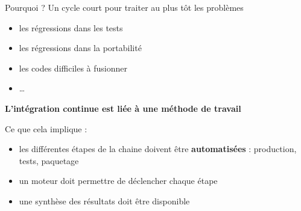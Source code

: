 \documentclass[9pt]{beamer}
\begin{document}
\begin{frame}{}

  \begin{block}{Pourquoi ?}
    Un cycle court pour traiter au plus tôt les problèmes
    \begin{itemize}
    \item les régressions dans les tests
    \item les régressions dans la portabilité
    \item les codes difficiles à fusionner 
    \item \dots
  \end{itemize}
  
  \textbf{L'intégration continue est liée à une méthode de travail}
  
\end{block}

\begin{block}{Ce que cela implique :}
\begin{itemize}
\item les différentes étapes de la chaine doivent être \textbf{automatisées} : production, tests, paquetage
\item un moteur doit permettre de déclencher chaque étape
\item une synthèse des résultats doit être disponible
\end{itemize}
\end{block}
\end{frame}
\end{document}
